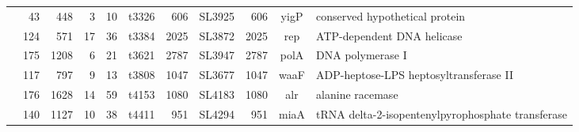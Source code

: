 \begin{landscape}
\begin{table}
\begin{tabular}{ r
    				r
				r
				r
				r
				l
				r
				l
				r
				c
				p{1.8in}}
    &43    & 448   & 3     & 10    & t3326 & 606   & SL3925 & 606   & yigP  & conserved hypothetical protein \\
    &124   & 571   & 17    & 36    & t3384 & 2025  & SL3872 & 2025  & rep   & ATP-dependent DNA helicase \\
    &175   & 1208  & 6     & 21    & t3621 & 2787  & SL3947 & 2787  & polA  & DNA polymerase I \\
    &117   & 797   & 9     & 13    & t3808 & 1047  & SL3677 & 1047  & waaF  & ADP-heptose-LPS heptosyltransferase II \\
    &176   & 1628  & 14    & 59    & t4153 & 1080  & SL4183 & 1080  & alr   & alanine racemase \\
    &140   & 1127  & 10    & 38    & t4411 & 951   & SL4294 & 951   & miaA  & tRNA delta-2-isopentenylpyrophosphate transferase \\
    \bottomrule
   \end{tabular}
    \label{tab:ty_uniq}%
    \end{table}%
\end{landscape}%
\endgroup

